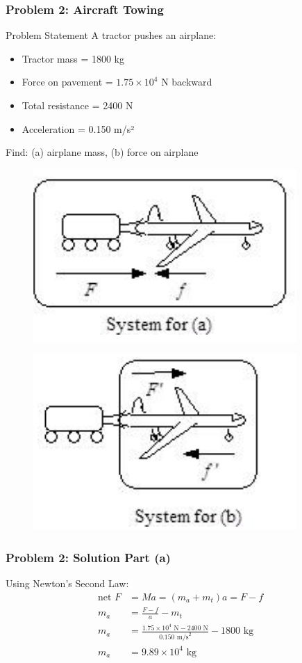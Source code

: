 \documentclass{beamer}
\begin{document}
\begin{frame}
\frametitle{Problem 2: Aircraft Towing}
\begin{block}{Problem Statement}
A tractor pushes an airplane:
\begin{itemize}
    \item Tractor mass = 1800 kg
    \item Force on pavement = $1.75 \times 10^4$ N backward
    \item Total resistance = 2400 N
    \item Acceleration = 0.150 m/s²
\end{itemize}
Find: (a) airplane mass, (b) force on airplane
\end{block}
\end{frame}
\begin{frame}
\begin{figure}
    \centering
    \includegraphics[width=0.5\linewidth]{CH9.5 4,5,9 Review/Screenshot 2024-11-12 092937.png}
\end{figure}
\begin{figure}
    \centering
    \includegraphics[width=0.5\linewidth]{CH9.5 4,5,9 Review/Screenshot 2024-11-12 092940.png}
    
\end{figure}
\end{frame}

\begin{frame}
\frametitle{Problem 2: Solution Part (a)}
Using Newton's Second Law:
\begin{align*}
\text{net }F &= Ma = (m_a + m_t)a = F - f\\
m_a &= \frac{F-f}{a} - m_t\\
m_a &= \frac{1.75 \times 10^4\text{ N} - 2400\text{ N}}{0.150\text{ m/s}^2} - 1800\text{ kg}\\
m_a &= 9.89 \times 10^4\text{ kg}
\end{align*}
\end{frame}
\end{document}
